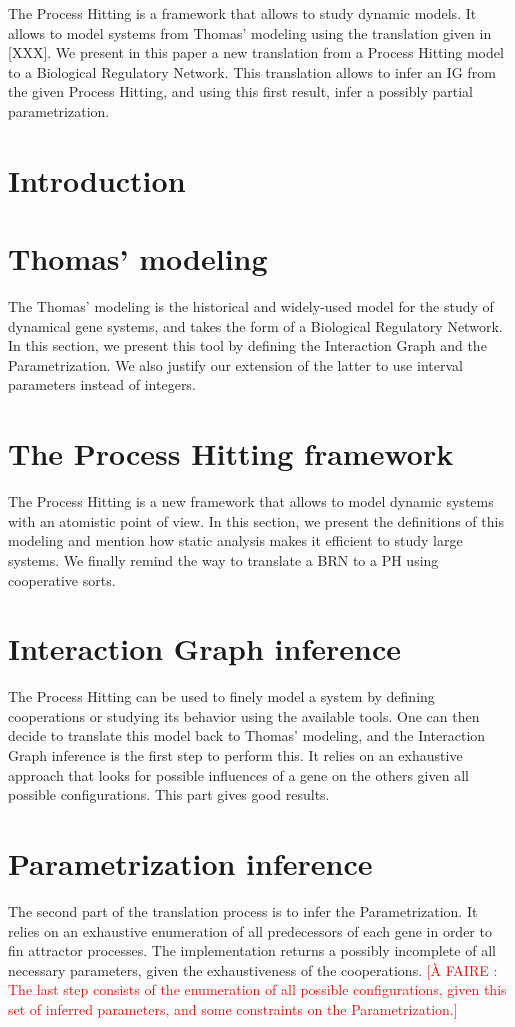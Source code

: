 \documentclass[fleqn,10pt]{article}
\newcommand{\afaire}[1]{\textcolor{red}{[À FAIRE : #1]}}
\begin{document}
The Process Hitting is a framework that allows to study dynamic models. It allows to model systems from Thomas' modeling using the translation given in [XXX]. We present in this paper a new translation from a Process Hitting model to a Biological Regulatory Network. This translation allows to infer an IG from the given Process Hitting, and using this first result, infer a possibly partial parametrization.

\section{Introduction}

\section{Thomas' modeling}
The Thomas' modeling is the historical and widely-used model for the study of dynamical gene systems, and takes the form of a Biological Regulatory Network. In this section, we present this tool by defining the Interaction Graph and the Parametrization. We also justify our extension of the latter to use interval parameters instead of integers.

\section{The Process Hitting framework}
The Process Hitting is a new framework that allows to model dynamic systems with an atomistic point of view. In this section, we present the definitions of this modeling and mention how static analysis makes it efficient to study large systems. We finally remind the way to translate a BRN to a PH using cooperative sorts.

\section{Interaction Graph inference}
The Process Hitting can be used to finely model a system by defining cooperations or studying its behavior using the available tools. One can then decide to translate this model back to Thomas' modeling, and the Interaction Graph inference is the first step to perform this. It relies on an exhaustive approach that looks for possible influences of a gene on the others given all possible configurations. This part gives good results.

\section{Parametrization inference}
The second part of the translation process is to infer the Parametrization. It relies on an exhaustive enumeration of all predecessors of each gene in order to fin attractor processes. The implementation returns a possibly incomplete of all necessary parameters, given the exhaustiveness of the cooperations. \afaire{The last step consists of the enumeration of all possible configurations, given this set of inferred parameters, and some constraints on the Parametrization.}
\end{document}
